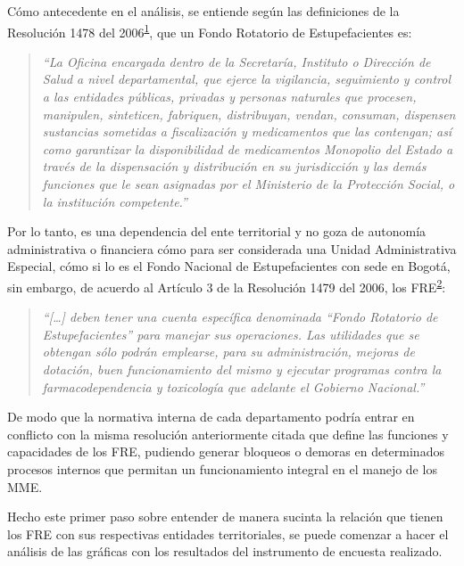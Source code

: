 \documentclass[
]{book}
\begin{document}
Cómo antecedente en el análisis, se entiende según las definiciones de la Resolución 1478 del 2006\textsuperscript{\protect\hyperlink{ref-MSPS1478-2006}{1}}, que un Fondo Rotatorio de Estupefacientes es:

\begin{quote}
\emph{``La Oficina encargada dentro de la Secretaría, Instituto o Dirección de Salud a nivel departamental, que ejerce la vigilancia, seguimiento y control a las entidades públicas, privadas y personas naturales que procesen, manipulen, sinteticen, fabriquen, distribuyan, vendan, consuman, dispensen sustancias sometidas a fiscalización y medicamentos que las contengan; así como garantizar la disponibilidad de medicamentos Monopolio del Estado a través de la dispensación y distribución en su jurisdicción y las demás funciones que le sean asignadas por el Ministerio de la Protección Social, o la institución competente.''}
\end{quote}

Por lo tanto, es una dependencia del ente territorial y no goza de autonomía administrativa o financiera cómo para ser considerada una Unidad Administrativa Especial, cómo si lo es el Fondo Nacional de Estupefacientes con sede en Bogotá, sin embargo, de acuerdo al Artículo 3 de la Resolución 1479 del 2006, los FRE\textsuperscript{\protect\hyperlink{ref-MSPS1479-2006}{2}}:

\begin{quote}
\emph{``{[}\ldots{]} deben tener una cuenta específica denominada ``Fondo Rotatorio de Estupefacientes'' para manejar sus operaciones. Las utilidades que se obtengan sólo podrán emplearse, para su administración, mejoras de dotación, buen funcionamiento del mismo y ejecutar programas contra la farmacodependencia y toxicología que adelante el Gobierno Nacional.''}
\end{quote}

De modo que la normativa interna de cada departamento podría entrar en conflicto con la misma resolución anteriormente citada que define las funciones y capacidades de los FRE, pudiendo generar bloqueos o demoras en determinados procesos internos que permitan un funcionamiento integral en el manejo de los MME.

Hecho este primer paso sobre entender de manera sucinta la relación que tienen los FRE con sus respectivas entidades territoriales, se puede comenzar a hacer el análisis de las gráficas con los resultados del instrumento de encuesta realizado.
\end{document}
